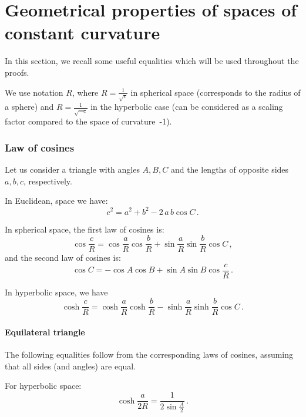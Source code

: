 \documentclass[runningheads]{llncs}
\begin{document}
%
%


%

\newpage

\appendix

\section{Geometrical properties of spaces of constant curvature}\label{sec:properties}

In this section, we recall some useful equalities which will be used throughout the proofs.

We use notation $R$, where $R = \frac{1}{\sqrt{c}}$ in spherical space (corresponds to the radius of a sphere) and  $R = \frac{1}{\sqrt{-c}}$ in the hyperbolic case (can be considered as a scaling factor compared to the space of curvature~-1).

\subsubsection{Law of cosines}

Let us consider a triangle with angles $A, B, C$ and the lengths of opposite sides $a, b, c$, respectively.

In Euclidean, space we have:
\[
c^2 = a^2 + b^2 - 2 \, a\, b \cos C\,.
\]

In spherical space, the first law of cosines is:
\[
\cos \frac{c}{R} =\cos \frac{a}{R} \cos \frac{b}{R} + \sin \frac{a}{R}\sin \frac{b}{R}\cos C \,,
\]
and the second law of cosines is:
\[
\cos C=-\cos A\cos B+\sin A\sin B\cos \frac{c}{R}\,.
\]

In hyperbolic space, we have 
\[
\cosh {\frac {c}{R}}= \cosh {\frac {a}{R}}\cosh {\frac {b}{R}}-\sinh {\frac {a}{R}}\sinh {\frac {b}{R}}\cos C \,.
\]

\paragraph{Equilateral triangle}

The following equalities follow from the corresponding laws of cosines, assuming that all sides (and angles) are equal.

For hyperbolic space:
\begin{equation}\label{eq:hyp_eq}
\cosh\frac{a}{2R} = \frac{1}{2\sin \frac{A}{2}}\,.
\end{equation}
\end{document}
